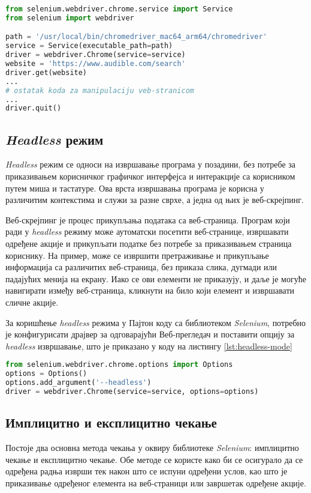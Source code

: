 \documentclass[12pt,oneside]{memoir}
\begin{document}
\begin{lstlisting}[language=Python, caption={Прикупљање \textit{HTML} кода веб-странице помоћу библиотеке \textit{Selenium}}, label={lst:selenium-driver-init}]
from selenium.webdriver.chrome.service import Service
from selenium import webdriver

path = '/usr/local/bin/chromedriver_mac64_arm64/chromedriver'
service = Service(executable_path=path)
driver = webdriver.Chrome(service=service)
website = 'https://www.audible.com/search'
driver.get(website)
...
# ostatak koda za manipulaciju veb-stranicom
...
driver.quit() 
\end{lstlisting}

\subsection{\textit{Headless} режим}
\textit{Headless} режим се односи на извршавање програма у позадини, без потребе за приказивањем корисничког графичког интерфејса и интеракције са корисником путем миша и тастатуре. Ова врста извршавања програма је корисна у различитим контекстима и служи за разне сврхе, а једна од њих је веб-скрејпинг. 

Веб-скрејпинг је процес прикупљања података са веб-страница. Програм који ради у \textit{headless} режиму може аутоматски посетити веб-странице, извршавати одређене акције и прикупљати податке без потребе за приказивањем страница кориснику. На пример, може се извршити претраживање и прикупљање информација са различитих веб-страница, без приказа слика, дугмади или падајућих менија на екрану. Иако се ови елементи не приказују, и даље је могуће навигирати између веб-страница, кликнути на било који елемент и извршавати сличне акције.

За коришћење \textit{headless} режима у Пајтон коду са библиотеком  \textit{Selenium}, потребно је конфигурисати драјвер за одговарајући Веб-прегледач и поставити опцију за \textit{headless} извршавање, што је приказано у коду на листингу \ref{lst:headless-mode} 
\begin{lstlisting}[language=Python, caption={Омогућавање \textit{headless} режима}, label={lst:headless-mode}]
from selenium.webdriver.chrome.options import Options
options = Options()
options.add_argument('--headless')
driver = webdriver.Chrome(service=service, options=options)
\end{lstlisting}

\subsection{Имплицитно и експлицитно чекање}
Постоје два основна метода чекања у оквиру библиотеке \textit{Selenium}: 
имплицитно чекање и експлицитно чекање. Обе методе се користе како би се осигурало да се одређена радња изврши тек након што се испуни одређени услов, као што је приказивање одређеног елемента на веб-страници или завршетак одређене акције.
\end{document}
